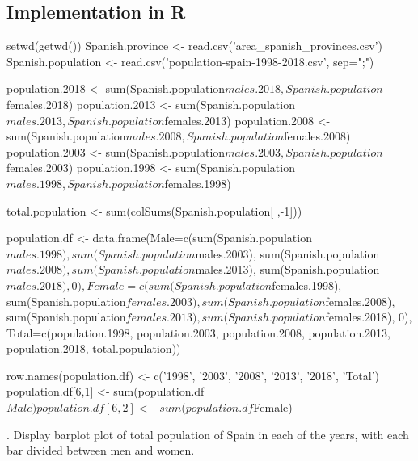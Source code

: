 \documentclass[12pt, oneside]{report}\usepackage[]{graphicx}\usepackage[]{color}
\begin{document}
\subsection*{Implementation in R}
\begin{Schunk}
\begin{Sinput}
setwd(getwd())
Spanish.province <- read.csv('area_spanish_provinces.csv')
Spanish.population <- read.csv('population-spain-1998-2018.csv', sep=";")

population.2018 <- sum(Spanish.population$males.2018, Spanish.population$females.2018)
population.2013 <- sum(Spanish.population$males.2013, Spanish.population$females.2013)
population.2008 <- sum(Spanish.population$males.2008, Spanish.population$females.2008)
population.2003 <- sum(Spanish.population$males.2003, Spanish.population$females.2003)
population.1998 <- sum(Spanish.population$males.1998, Spanish.population$females.1998)

total.population <- sum(colSums(Spanish.population[ ,-1]))

population.df <- data.frame(Male=c(sum(Spanish.population$males.1998), 
                                   sum(Spanish.population$males.2003), 
                                   sum(Spanish.population$males.2008), 
                                   sum(Spanish.population$males.2013), 
                                   sum(Spanish.population$males.2018), 0),
                 Female=c(sum(Spanish.population$females.1998), 
                          sum(Spanish.population$females.2003), 
                          sum(Spanish.population$females.2008), 
                          sum(Spanish.population$females.2013), 
                          sum(Spanish.population$females.2018), 0),
                 Total=c(population.1998, population.2003, 
                         population.2008, population.2013, 
                         population.2018, total.population))

row.names(population.df) <- c('1998', '2003', '2008', '2013', '2018', 'Total')
population.df[6,1] <- sum(population.df$Male)
population.df[6,2] <- sum(population.df$Female)
\end{Sinput}
\end{Schunk}

. Display barplot plot of total population of Spain in each of the years, with each bar divided
between men and women.
\end{document}
